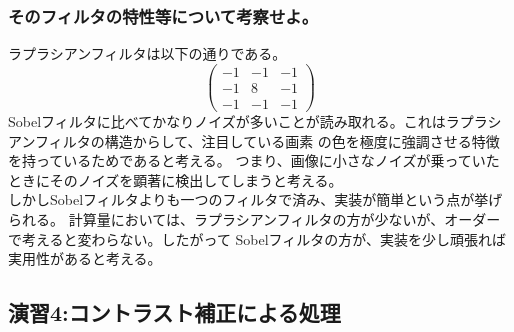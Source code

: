 ﻿\documentclass[a4j,11pt]{jarticle}
\begin{document}
\subsubsection{そのフィルタの特性等について考察せよ。}
ラプラシアンフィルタは以下の通りである。
$$
\begin{pmatrix}
   -1 & -1 & -1 \\
   -1 &  8 & -1 \\
   -1 & -1 & -1 
\end{pmatrix}
$$
Sobelフィルタに比べてかなりノイズが多いことが読み取れる。これはラプラシアンフィルタの構造からして、注目している画素
の色を極度に強調させる特徴を持っているためであると考える。
つまり、画像に小さなノイズが乗っていたときにそのノイズを顕著に検出してしまうと考える。\\
しかしSobelフィルタよりも一つのフィルタで済み、実装が簡単という点が挙げられる。
計算量においては、ラプラシアンフィルタの方が少ないが、オーダーで考えると変わらない。したがって
Sobelフィルタの方が、実装を少し頑張れば実用性があると考える。

\subsection{演習4:コントラスト補正による処理}
\end{document}
